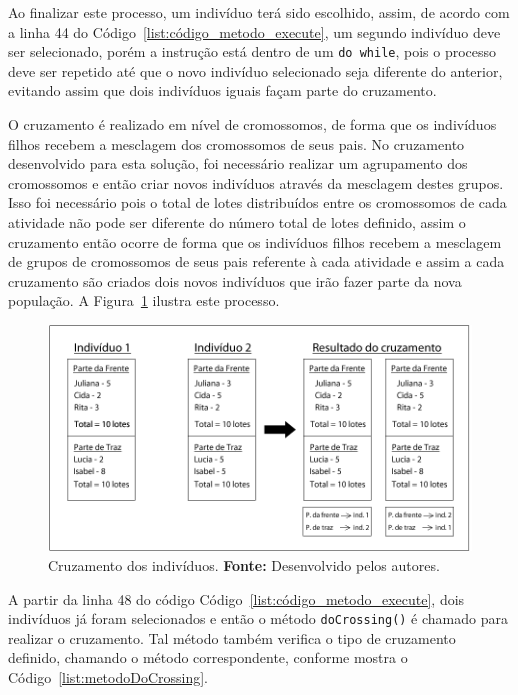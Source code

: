 \par Ao finalizar este processo, um indivíduo terá sido escolhido, assim, de acordo com a linha 44 do Código~\ref{list:código_metodo_execute},
um segundo	 indivíduo deve ser selecionado, porém a instrução está dentro de um \texttt{do while}, pois o processo deve ser repetido até que 
o novo indivíduo selecionado seja diferente do anterior, evitando assim que dois indivíduos iguais façam parte do cruzamento.

\par O cruzamento é realizado em nível de cromossomos, de forma que os indivíduos filhos recebem 
a mesclagem dos cromossomos de seus pais. No cruzamento desenvolvido para esta solução, foi 
necessário realizar um agrupamento dos cromossomos e então criar novos indivíduos através da
mesclagem destes grupos. Isso foi necessário pois o total de lotes
distribuídos entre os cromossomos de cada atividade não pode ser diferente do número total de lotes definido, assim o 
cruzamento então ocorre de forma que os indivíduos filhos recebem a mesclagem de grupos de 
cromossomos de seus pais referente à cada atividade e assim a cada cruzamento são criados
dois novos indivíduos que irão fazer parte da nova população. A Figura~\ref{fig:ex_cruzamento} ilustra este processo.

\begin{figure}[h!]
	\centerline{\includegraphics[scale=0.4]{./imagens/ex_cruzamento.png}}
	\caption[Cruzamento dos indivíduos.]
	{Cruzamento dos indivíduos.
		\textbf{Fonte:} Desenvolvido pelos autores.}
	\label{fig:ex_cruzamento}
\end{figure}


\par A partir da linha 48 do código Código~\ref{list:código_metodo_execute}, dois indivíduos já foram selecionados e então o 
método \texttt{doCrossing()} é chamado para realizar o cruzamento. Tal método também verifica o tipo de cruzamento definido,
chamando o método correspondente, conforme mostra o Código~\ref{list:metodoDoCrossing}. 



